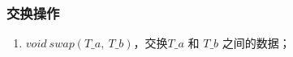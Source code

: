 \subsubsection{交换操作}
\begin{enumerate}
    \item $void\ swap(T\_a,\ T\_b)$，交换$T\_a$ 和 $T\_b$ 之间的数据；
\end{enumerate}